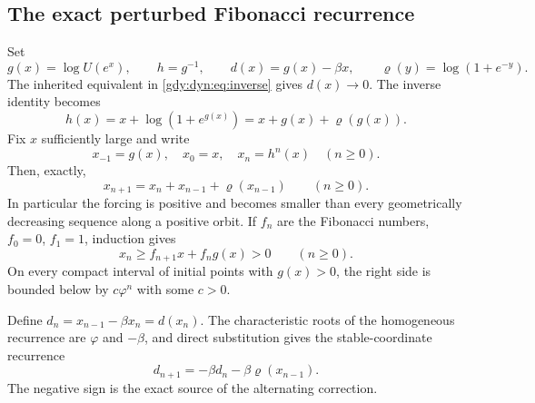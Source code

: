 \documentclass[11pt]{article}
\numberwithin{equation}{section}
\theoremstyle{definition}
\theoremstyle{remark}
\begin{document}
\subsection{The exact perturbed Fibonacci recurrence}
\label{gdy:dyn:sub:recurrence}

Set
\begin{equation}\label{gdy:dyn:eq:gdef}
 g(x)=\log U(e^x),\qquad h=g^{-1},\qquad
 d(x)=g(x)-\beta x,\qquad \varrho(y)=\log(1+e^{-y}).
\end{equation}
The inherited equivalent in \eqref{gdy:dyn:eq:inverse} gives $d(x)\to0$.
The inverse identity becomes
\begin{equation}\label{gdy:dyn:eq:h}
 h(x)=x+\log(1+e^{g(x)})=x+g(x)+\varrho(g(x)).
\end{equation}
Fix $x$ sufficiently large and write
\begin{equation}\label{gdy:dyn:eq:orbit}
 x_{-1}=g(x),\quad x_0=x,\quad x_n=h^n(x)\quad(n\ge0).
\end{equation}
Then, exactly,
\begin{equation}\label{gdy:dyn:eq:fibonacci}
 x_{n+1}=x_n+x_{n-1}+\varrho(x_{n-1})\qquad(n\ge0).
\end{equation}
In particular the forcing is positive and becomes smaller than every
geometrically decreasing sequence along a positive orbit. If $f_n$ are
the Fibonacci numbers, $f_0=0$, $f_1=1$, induction gives
\begin{equation}\label{gdy:dyn:eq:fiblower}
 x_n\ge f_{n+1}x+f_ng(x)>0\qquad(n\ge0).
\end{equation}
On every compact interval of initial points with $g(x)>0$, the right
side is bounded below by $c\varphi^n$ with some $c>0$.

Define $d_n=x_{n-1}-\beta x_n=d(x_n)$. The characteristic roots of the
homogeneous recurrence are $\varphi$ and $-\beta$, and direct
substitution gives the stable-coordinate recurrence
\begin{equation}\label{gdy:dyn:eq:stable}
 d_{n+1}=-\beta d_n-\beta \varrho(x_{n-1}).
\end{equation}
The negative sign is the exact source of the alternating correction.
\end{document}
